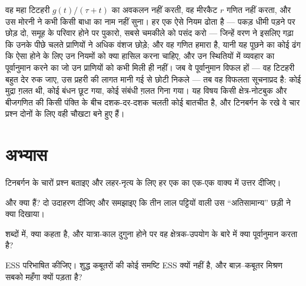 \begin{remark}\label{rem:b3:behavioural-ecology:remark}
वह महा टिटहरी $g(t)/(\tau + t)$ का अवकलन नहीं करती, वह मीरकैट $r$ गणित
नहीं करता, और उस मोरनी ने कभी किसी बाधा का नाम नहीं सुना। हर एक ऐसे
नियम ढोता है --- पकड़ धीमी पड़ने पर छोड़ दो, समूह के परिवार होने पर
पुकारो, सबसे चमकीले को पसंद करो --- जिन्हें वरण ने इसलिए गढ़ा कि उनके
पीछे चलते प्राणियों ने अधिक वंशज छोड़े; और वह गणित हमारा है, यानी यह
पूछने का कोई ढंग कि ऐसा होने के लिए उन नियमों को क्या हासिल करना चाहिए,
और उन स्थितियों में व्यवहार का पूर्वानुमान करने का जो उन प्राणियों को
कभी मिली ही नहीं। जब वे पूर्वानुमान विफल हों --- वह टिटहरी बहुत देर रुक
जाए, उस प्रहरी की लागत मानी गई से छोटी निकले --- तब वह विफलता
सूचनाप्रद है: कोई मुद्रा ग़लत थी, कोई बंधन छूट गया, कोई संबंधी ग़लत गिना
गया। यह विषय किसी क्षेत्र-नोटबुक और बीजगणित की किसी पंक्ति के बीच
दशक-दर-दशक चलती कोई बातचीत है, और टिनबर्गन के रखे वे चार प्रश्न दोनों के
लिए वही चौखटा बने हुए हैं।
\end{remark}

\section{अभ्यास}

\begin{exercise}[$\star$]\label{exo:b3:behavioural-ecology:1}
टिनबर्गन के चारों प्रश्न बताइए और लहर-नृत्य के लिए हर एक का एक-एक वाक्य
में उत्तर दीजिए।
\end{exercise}

\begin{exercise}[$\star$]\label{exo:b3:behavioural-ecology:2}
 और  क्या हैं? दो उदाहरण दीजिए और
समझाइए कि तीन लाल पट्टियों वाली उस ``अतिसामान्य'' छड़ी ने क्या दिखाया।
\end{exercise}

\begin{exercise}[$\star$]\label{exo:b3:behavioural-ecology:3}
शब्दों में,  क्या कहता है, और यात्रा-काल दुगुना होने
पर वह क्षेत्रक-उपयोग के बारे में क्या पूर्वानुमान करता है?
\end{exercise}

\begin{exercise}[$\star$]\label{exo:b3:behavioural-ecology:4}
ESS परिभाषित कीजिए। शुद्ध कबूतरों की कोई समष्टि ESS क्यों नहीं है, और
बाज़--कबूतर मिश्रण सबको महँगा क्यों पड़ता है?
\end{exercise}

